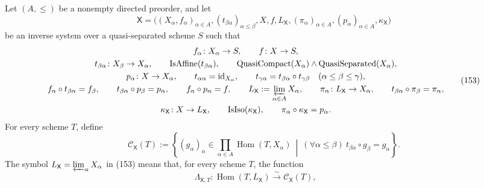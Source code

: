 \begin{definition}
  \label{def:nagata-fixed-base-separated-stage}

  Let $(A,\leq)$ be a nonempty directed preorder, and let
  \[
    \mathsf X
      =\bigl((X_\alpha,f_\alpha)_{\alpha\in A},
        (t_{\beta\alpha})_{\alpha\leq\beta},
        X,f,L_{\mathsf X},(\pi_\alpha)_{\alpha\in A},
        (p_\alpha)_{\alpha\in A},\kappa_{\mathsf X}\bigr)         \tag{152}
  \]
  be an inverse system over a quasi-separated scheme $S$ such that
  \[
  \begin{gathered}
    f_\alpha\colon X_\alpha\to S,\qquad f\colon X\to S,\\
    t_{\beta\alpha}\colon X_\beta\to X_\alpha,\qquad
    \operatorname{IsAffine}(t_{\beta\alpha}),\qquad
    \operatorname{QuasiCompact}(X_\alpha)
      \wedge\operatorname{QuasiSeparated}(X_\alpha),\\
    p_\alpha\colon X\to X_\alpha,\qquad
    t_{\alpha\alpha}=\operatorname{id}_{X_\alpha},\qquad
    t_{\gamma\alpha}
      =t_{\beta\alpha}\circ t_{\gamma\beta}
      \quad(\alpha\leq\beta\leq\gamma),\\
    f_\alpha\circ t_{\beta\alpha}=f_\beta,\qquad
    t_{\beta\alpha}\circ p_\beta=p_\alpha,\qquad
    f_\alpha\circ p_\alpha=f,\qquad
    L_{\mathsf X}:=\varprojlim_{\alpha\in A}X_\alpha,\qquad
    \pi_\alpha\colon L_{\mathsf X}\to X_\alpha,\qquad
    t_{\beta\alpha}\circ\pi_\beta=\pi_\alpha,\\
    \kappa_{\mathsf X}\colon X\to L_{\mathsf X},\qquad
    \operatorname{IsIso}(\kappa_{\mathsf X}),\qquad
    \pi_\alpha\circ\kappa_{\mathsf X}=p_\alpha .
  \end{gathered}                                                 \tag{153}
  \]
  For every scheme \(T\), define
  \[
    \mathcal C_{\mathsf X}(T):=
      \left\{(g_\alpha)_\alpha\in
        \prod_{\alpha\in A}\operatorname{Hom}(T,X_\alpha)
      \ \middle|\
        (\forall\alpha\leq\beta)\
          t_{\beta\alpha}\circ g_\beta=g_\alpha\right\}.           \tag{153a}
  \]
  The symbol \(L_{\mathsf X}=\varprojlim_\alpha X_\alpha\) in (153) means
  that, for every scheme \(T\), the function
  \[
    \Lambda_{\mathsf X,T}\colon
      \operatorname{Hom}(T,L_{\mathsf X})
        \xrightarrow{\sim}\mathcal C_{\mathsf X}(T),\qquad
\]
\end{definition}
